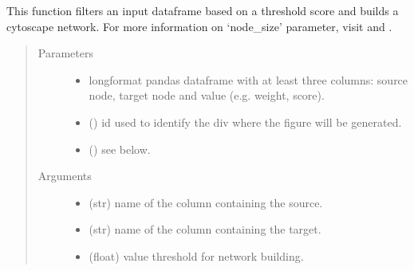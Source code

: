 \documentclass[letterpaper,10pt,english]{sphinxmanual}
\begin{document}
\begin{fulllineitems}
\label{\detokenize{_autosummary/analytics_core.viz:analytics_core.viz.viz.get_network}}
This function filters an input dataframe based on a threshold score and builds a cytoscape network. For more information on     ‘node\_size’ parameter, visit  and     .
\begin{quote}\begin{description}
\item[{Parameters}] \leavevmode\begin{itemize}
\item {} 
 \textendash{} long\sphinxhyphen{}format pandas dataframe with at least three columns: source node, target node and value (e.g. weight, score).

\item {} 
 () \textendash{} id used to identify the div where the figure will be generated.

\item {} 
 () \textendash{} see below.

\end{itemize}

\item[{Arguments}] \leavevmode\begin{itemize}
\item {} 
 (str) \textendash{} name of the column containing the source.

\item {} 
 (str) \textendash{} name of the column containing the target.

\item {} 
 (float) \textendash{} value threshold for network building.


\end{itemize}
\end{description}
\end{quote}
\end{fulllineitems}
\end{document}

